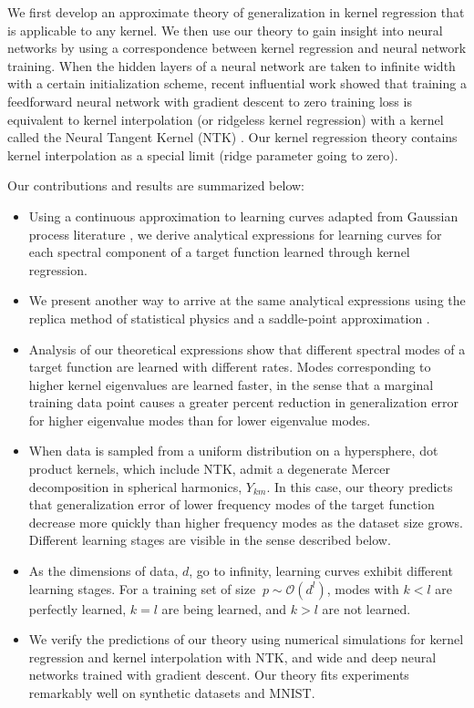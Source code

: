 \documentclass{article}
\begin{document}
We first develop an approximate theory of generalization in kernel regression that is applicable to any kernel. We then use our theory to gain insight into neural networks by using a correspondence between kernel regression and neural network training. When the hidden layers of a neural network are taken to infinite width with a certain initialization scheme, recent influential work \cite{jacot2018neural,arora2019exact,lee2019wide} showed that training a feedforward neural network with gradient descent to zero training loss is equivalent to kernel interpolation (or ridgeless kernel regression) with a kernel called the Neural Tangent Kernel (NTK) \cite{jacot2018neural}. %
Our kernel regression theory contains kernel interpolation as a special limit (ridge parameter going to zero).


Our contributions and results are summarized below:
\begin{itemize}[leftmargin=*,noitemsep,topsep=0pt]
    \item Using a continuous approximation to learning curves adapted from Gaussian process literature \cite{sollich1999learning,sollich2001mismatch}, we derive analytical expressions for learning curves for each spectral component of a target function learned through kernel regression. 
    \item We present another way to arrive at the same analytical expressions using the replica method of statistical physics and a saddle-point approximation \cite{sherrington_spinglass,mezard1987spin}. 
    \item Analysis of our theoretical expressions show that different spectral modes of a target function are learned with different rates. Modes corresponding to higher kernel eigenvalues are learned faster, in the sense that a marginal training data point causes a greater percent reduction in generalization error for higher eigenvalue modes than for lower eigenvalue modes. 
    \item When data is sampled from a uniform distribution on a hypersphere, dot product kernels, which include NTK, admit a degenerate Mercer decomposition in spherical harmonics, $Y_{km}$. In this case, our theory predicts that generalization error of lower frequency modes of the target function decrease more quickly than higher frequency modes as the dataset size grows. Different learning stages are visible in the sense described below.
    \item As the dimensions of data, $d$, go to infinity, learning curves exhibit different learning stages. For a training set of size $\ p \sim \mathcal{O}( d^l)$, modes with $k < l$ are perfectly learned, $k=l$ are being learned, and $k>l$ are not learned.
    \item We verify the predictions of our theory using numerical simulations for kernel regression and kernel interpolation with NTK, and wide and deep neural networks trained with gradient descent. Our theory fits experiments remarkably well on synthetic datasets and MNIST.
\end{itemize}
\end{document}
